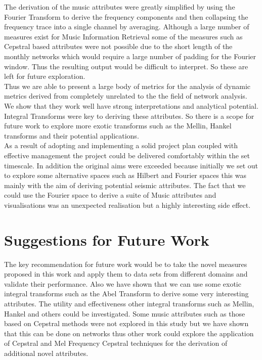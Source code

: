 The derivation of the music attributes were greatly simplified by using the Fourier Transform to derive the frequency components and then collapsing the frequency trace into a single channel by averaging. Although a large number of measures exist for Music Information Retrieval some of the measures such as Cepstral based attributes were not possible due to the short length of the monthly networks which would require a large number of padding for the Fourier window. Thus the resulting output would be difficult to interpret. So these are left for future exploration. \\

Thus we are able to present a large body of metrics for the analysis of dynamic metrics derived from completely unrelated to the the field of network analysis. We show that they work well have strong interpretations and analytical potential. Integral Transforms were key to deriving these attributes. So there is a scope for future work to explore more exotic transforms such as the Mellin, Hankel transforms and their potential applications. \\

As a result of adopting and implementing a solid project plan coupled with effective management the project could be delivered comfortably within the set timescale. In addition the original aims were exceeded because initially we set out to explore some alternative spaces such as Hilbert and Fourier spaces this was mainly with the aim of deriving potential seismic attributes. The fact that we could use the Fourier space to derive a suite of Music attributes and visualisations was an unexpected realisation but a highly interesting side effect. \\

\section{Suggestions for Future Work}

The key recommendation for future work would be to take the novel measures proposed in this work and apply them to data sets from different domains and validate their performance. Also we have shown that we can use some exotic integral transforms such as the Abel Transform to derive some very interesting attributes. The utility and effectiveness other integral transforms such as Mellin, Hankel and others could be investigated. Some music attributes such as those based on Cepstral methods were not explored in this study but we have shown that this can be done on networks thus other work could explore the application of Cepstral and Mel Frequency Cepstral techniques for the derivation of additional novel attributes. \\

